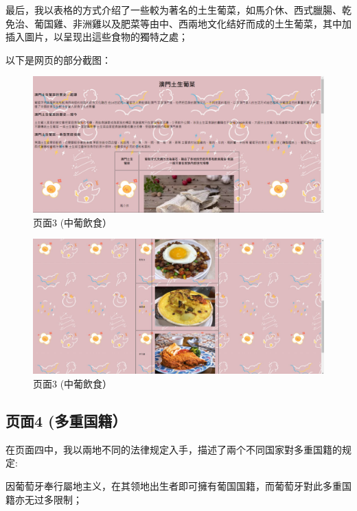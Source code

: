 \documentclass[supercite]{Experimental_Report}
\theoremstyle{definition}
\begin{document}
	最后，我以表格的方式介绍了一些較为著名的土生葡菜，如馬介休、西式臘腸、乾免治、葡国雞、非洲雞以及肥菜等由中、西兩地文化结好而成的土生葡菜，其中加插入圖片，以呈现出這些食物的獨特之處；
	
	以下是网页的部分截图：
	
	
	\begin{figure}[htb]
		\begin{center}
			\includegraphics[scale=0.40]{images/3-3.jpg}
			\caption{页面3 (中葡飲食）}
			\label{fig3-3}
		\end{center}
	\end{figure}
	\begin{figure}[htb]
		\begin{center}
			\includegraphics[scale=0.30]{images/3-3-1.jpg}
			\caption{页面3 (中葡飲食）}
			\label{fig3-3-1}
		\end{center}
	\end{figure}
	
	\newpage
	
	\subsection{页面4 (多重国籍）}
	在页面四中，我以兩地不同的法律规定入手，描述了兩个不同国家對多重国籍的规定:
	
	因葡萄牙奉行屬地主义，在其领地出生者即可擁有葡国国籍，而葡萄牙對此多重国籍亦无过多限制；
	
\end{document}
